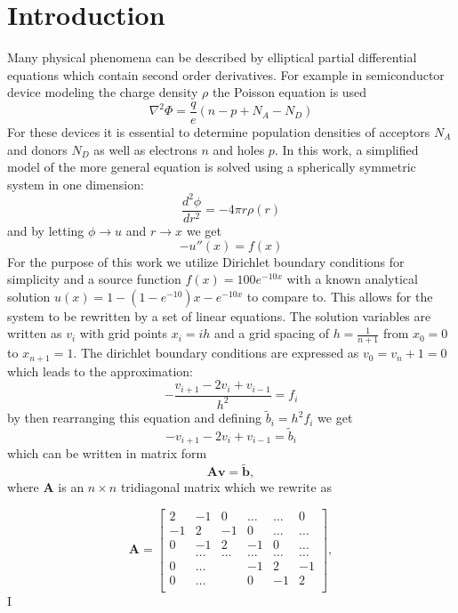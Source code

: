 \documentclass[10pt, a4paper]{amsart}
\begin{document}
\section{Introduction}
Many physical phenomena can be described by elliptical partial differential equations which contain second order derivatives. For example in semiconductor device modeling the charge density $\rho$ the Poisson equation is used
\begin{equation}
\nabla^2 \Phi = \frac{q}{e}(n-p+N_A-N_D)
\end{equation}
For these devices it is essential to determine population densities of acceptors $N_A$ and donors $N_D$ as well as electrons $n$ and holes $p$. In this work, a simplified model of the more general equation is solved using a spherically symmetric system in one dimension:
\begin{equation}
\frac{d^2\phi}{dr^2}=-4\pi r\rho(r)
\end{equation}
and by letting $\phi \rightarrow u$ and $r \rightarrow x$ we get
\begin{equation}
-u''(x)=f(x) 
\end{equation}
For the purpose of this work we utilize Dirichlet boundary conditions for simplicity and a source function $f(x) = 100e^{-10x}$ with a known analytical solution $u(x) = 1-(1-e^{-10})x-e^{-10x}$ to compare to. This allows for the system to be rewritten by a set of linear equations. The solution variables are written as $v_i$ with grid points $x_i=ih$ and a grid spacing of $h=\frac{1}{n+1}$ from $x_0 = 0$ to $x_{n+1}=1$. The dirichlet boundary conditions are expressed as $v_0=v_n+1=0$ which leads to the approximation:
\begin{equation}
-\frac{v_{i+1}-2v_i+v_{i-1}}{h^2}=f_i 
\end{equation}
by then rearranging this equation and defining $\tilde{b}_i=h^2 f_i$ we get
\begin{equation}
-v_{i+1}-2v_i+v_{i-1}=\tilde{b}_i
\end{equation}
which can be written in matrix form 
\begin{equation*}
   \mathbf{A}\mathbf{v} = \tilde{\mathbf{b}},
\end{equation*}
where $\mathbf{A}$ is an $n\times n$  tridiagonal matrix which we rewrite as

\[
    \mathbf{A} = \begin{bmatrix}
                           2& -1& 0 &\dots   & \dots &0 \\
                           -1 & 2 & -1 &0 &\dots &\dots \\
                           0&-1 &2 & -1 & 0 & \dots \\
                           & \dots   & \dots &\dots   &\dots & \dots \\
                           0&\dots   &  &-1 &2& -1 \\
                           0&\dots    &  & 0  &-1 & 2 \\
                      \end{bmatrix},
\]I
\end{document}

